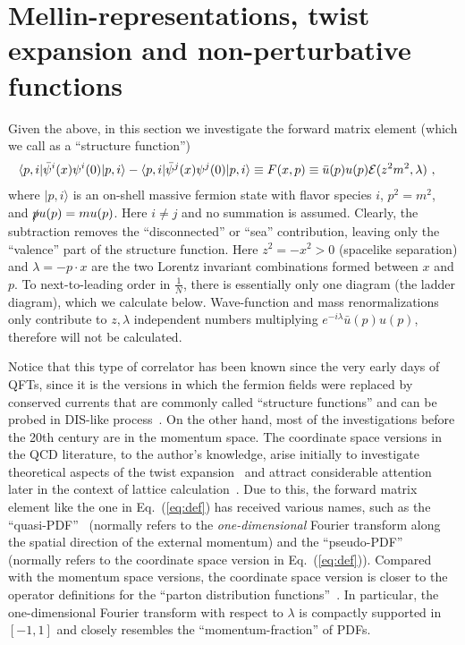 \documentclass[a4paper,11pt]{article}
\begin{document}
\section{Mellin-representations, twist expansion and non-perturbative functions}

Given the above, in this section we investigate the forward matrix element (which we call as a ``structure function'') 
\begin{align}\label{eq:def}
&\langle p,i|\bar \psi^i(x)\psi^i(0)|p,i\rangle-\langle p,i|\bar \psi^j(x)\psi^j(0)|p,i\rangle \equiv F(x,p) \equiv \bar u(p)u(p){\cal E}(z^2m^2,\lambda) \ ,
\end{align}
where $|p,i\rangle$ is an on-shell massive fermion state with flavor species $i$, $p^2=m^2$, and $\slashed{p}u(p)=mu(p)$. Here $i\ne j$ and no summation is assumed. Clearly, the subtraction removes the ``disconnected'' or ``sea'' contribution, leaving only the ``valence'' part of the structure function. Here $z^2=-x^2>0$ (spacelike separation) and $\lambda=-p\cdot x$ are the two Lorentz invariant combinations formed between $x$ and $p$. To next-to-leading order in $\frac{1}{N}$, there is essentially only one diagram (the ladder diagram), which we calculate below. Wave-function and mass renormalizations only contribute to  $z,\lambda$ independent numbers multiplying $e^{-i\lambda}\bar u(p) u(p)$, therefore will not be calculated. 

Notice that this type of correlator has been known since the very early days of QFTs,  since it is the versions in which  
the fermion fields were replaced by conserved currents that are commonly called ``structure functions'' and can be probed in DIS-like process~\cite{Itzykson:1980rh, Sterman:1993hfp, Collins:2011zzd}. On the other hand, most of the investigations before the 20th century are in the momentum space. The coordinate space versions in the QCD literature, to the author's knowledge, arise initially to investigate theoretical aspects of the twist expansion~\cite{Braun:2004bu} and attract considerable attention later in the context of lattice calculation~\cite{Ji:2013dva,Ji:2020ect,Cichy:2021ewm}. Due to this, the forward matrix element like the one in Eq.~(\ref{eq:def}) has received various names, such as the ``quasi-PDF''~\cite{Ji:2013dva} (normally refers to the {\it one-dimensional} Fourier transform along the spatial direction of the external momentum) and the ``pseudo-PDF''~\cite{Radyushkin:2017cyf} (normally refers to the coordinate space version in Eq.~(\ref{eq:def})). Compared with the momentum space versions, the coordinate space version is closer to the operator definitions for the ``parton distribution functions''~\cite{Collins:2011zzd}. In particular, the one-dimensional Fourier transform with respect to $\lambda$ is compactly supported in $[-1,1]$ and closely resembles the ``momentum-fraction'' of PDFs. 
\end{document}
